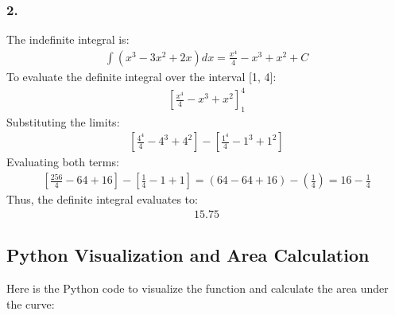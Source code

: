 \documentclass[letterpaper,10pt,english]{jupyterBook}
\begin{document}
\subsubsection{2. }
\label{\detokenize{prerequisites:integral}}
\sphinxAtStartPar
The indefinite integral is:
\begin{equation*}
\begin{split}
\int (x^3 - 3x^2 + 2x) dx = \frac{x^4}{4} - x^3 + x^2 + C
\end{split}
\end{equation*}
\sphinxAtStartPar
To evaluate the definite integral over the interval {[}1, 4{]}:
\begin{equation*}
\begin{split}
\left[\frac{x^4}{4} - x^3 + x^2 \right]_{1}^{4}
\end{split}
\end{equation*}
\sphinxAtStartPar
Substituting the limits:
\begin{equation*}
\begin{split}
\left[\frac{4^4}{4} - 4^3 + 4^2\right] - \left[\frac{1^4}{4} - 1^3 + 1^2\right]
\end{split}
\end{equation*}
\sphinxAtStartPar
Evaluating both terms:
\begin{equation*}
\begin{split}
\left[\frac{256}{4} - 64 + 16\right] - \left[\frac{1}{4} - 1 + 1\right] = (64 - 64 + 16) - \left(\frac{1}{4}\right) = 16 - \frac{1}{4}
\end{split}
\end{equation*}
\sphinxAtStartPar
Thus, the definite integral evaluates to:
\begin{equation*}
\begin{split}
15.75
\end{split}
\end{equation*}

\subsection{Python Visualization and Area Calculation}
\label{\detokenize{prerequisites:python-visualization-and-area-calculation}}
\sphinxAtStartPar
Here is the Python code to visualize the function and calculate the area under the curve:
\end{document}
